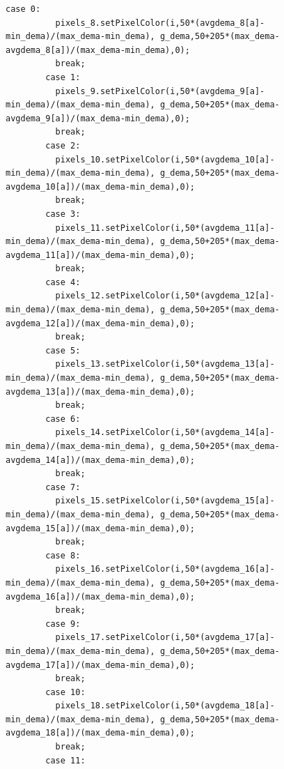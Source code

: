 \documentclass[a4paper,9pt]{article}
\begin{document}
\begin{lstlisting}[basicstyle=\tiny,style=CStyle]
        case 0:
          pixels_8.setPixelColor(i,50*(avgdema_8[a]-min_dema)/(max_dema-min_dema), g_dema,50+205*(max_dema-avgdema_8[a])/(max_dema-min_dema),0);
          break;
        case 1:
          pixels_9.setPixelColor(i,50*(avgdema_9[a]-min_dema)/(max_dema-min_dema), g_dema,50+205*(max_dema-avgdema_9[a])/(max_dema-min_dema),0);
          break;
        case 2:
          pixels_10.setPixelColor(i,50*(avgdema_10[a]-min_dema)/(max_dema-min_dema), g_dema,50+205*(max_dema-avgdema_10[a])/(max_dema-min_dema),0);
          break;
        case 3:
          pixels_11.setPixelColor(i,50*(avgdema_11[a]-min_dema)/(max_dema-min_dema), g_dema,50+205*(max_dema-avgdema_11[a])/(max_dema-min_dema),0);
          break;
        case 4:
          pixels_12.setPixelColor(i,50*(avgdema_12[a]-min_dema)/(max_dema-min_dema), g_dema,50+205*(max_dema-avgdema_12[a])/(max_dema-min_dema),0);
          break;
        case 5:
          pixels_13.setPixelColor(i,50*(avgdema_13[a]-min_dema)/(max_dema-min_dema), g_dema,50+205*(max_dema-avgdema_13[a])/(max_dema-min_dema),0);
          break;
        case 6:
          pixels_14.setPixelColor(i,50*(avgdema_14[a]-min_dema)/(max_dema-min_dema), g_dema,50+205*(max_dema-avgdema_14[a])/(max_dema-min_dema),0);
          break;
        case 7:
          pixels_15.setPixelColor(i,50*(avgdema_15[a]-min_dema)/(max_dema-min_dema), g_dema,50+205*(max_dema-avgdema_15[a])/(max_dema-min_dema),0);
          break;
        case 8:  
          pixels_16.setPixelColor(i,50*(avgdema_16[a]-min_dema)/(max_dema-min_dema), g_dema,50+205*(max_dema-avgdema_16[a])/(max_dema-min_dema),0);
          break;
        case 9:  
          pixels_17.setPixelColor(i,50*(avgdema_17[a]-min_dema)/(max_dema-min_dema), g_dema,50+205*(max_dema-avgdema_17[a])/(max_dema-min_dema),0);
          break;
        case 10:  
          pixels_18.setPixelColor(i,50*(avgdema_18[a]-min_dema)/(max_dema-min_dema), g_dema,50+205*(max_dema-avgdema_18[a])/(max_dema-min_dema),0);
          break;
        case 11:
          

\end{lstlisting}
\end{document}
